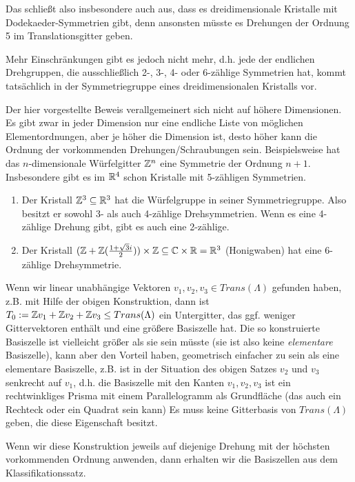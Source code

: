 \begin{remark}
Das schließt also insbesondere auch aus, dass es dreidimensionale Kristalle mit Dodekaeder-Symmetrien gibt, denn ansonsten müsste es Drehungen der Ordnung 5 im Translationsgitter geben.

Mehr Einschränkungen gibt es jedoch nicht mehr, d.h. jede der endlichen Drehgruppen, die ausschließlich 2-, 3-, 4- oder 6-zählige Symmetrien hat, kommt tatsächlich in der Symmetriegruppe eines dreidimensionalen Kristalls vor.

Der hier vorgestellte Beweis verallgemeinert sich nicht auf höhere Dimensionen. Es gibt zwar in jeder Dimension nur eine endliche Liste von möglichen Elementordnungen, aber je höher die Dimension ist, desto höher kann die Ordnung der vorkommenden Drehungen/Schraubungen sein. Beispielsweise hat das $n$-dimensionale Würfelgitter $\mathbb{Z}^n$ eine Symmetrie der Ordnung $n+1$. Insbesondere gibt es im $\mathbb{R}^4$ schon Kristalle mit 5-zähligen Symmetrien.
\end{remark}

\begin{example}
\begin{enumerate}
\item Der Kristall $\mathbb{Z}^3\subseteq\mathbb{R}^3$ hat die Würfelgruppe in seiner Symmetriegruppe. Also besitzt er sowohl 3- als auch 4-zählige Drehsymmetrien. Wenn es eine 4-zählige Drehung gibt, gibt es auch eine 2-zählige.
\item Der Kristall $(\mathbb{Z}+\mathbb{Z}(\tfrac{1+\sqrt{3}i}{2})) \times \mathbb{Z} \subseteq \mathbb{C}\times\mathbb{R} = \mathbb{R}^3$ (Honigwaben) hat eine 6-zählige Drehsymmetrie.
\end{enumerate}
\end{example}

\begin{remark}
Wenn wir linear unabhängige Vektoren $v_1,v_2,v_3\in Trans(\Lambda)$ gefunden haben, z.B. mit Hilfe der obigen Konstruktion, dann ist $T_0:=\mathbb{Z} v_1+\mathbb{Z} v_2+\mathbb{Z} v_3 \leq Trans(\Lambda)$ ein Untergitter, das ggf. weniger Gittervektoren enthält und eine größere Basiszelle hat. Die so konstruierte Basiszelle ist vielleicht größer als sie sein müsste (sie ist also keine \emph{elementare} Basiszelle), kann aber den Vorteil haben, geometrisch einfacher zu sein als eine elementare Basiszelle, z.B. ist in der Situation des obigen Satzes $v_2$ und $v_3$ senkrecht auf $v_1$, d.h. die Basiszelle mit den Kanten $v_1,v_2,v_3$ ist ein rechtwinkliges Prisma mit einem Parallelogramm als Grundfläche (das auch ein Rechteck oder ein Quadrat sein kann) Es muss keine Gitterbasis von $Trans(\Lambda)$ geben, die diese Eigenschaft besitzt.

Wenn wir diese Konstruktion jeweils auf diejenige Drehung mit der höchsten vorkommenden Ordnung anwenden, dann erhalten wir die Basiszellen aus dem Klassifikationssatz.
\end{remark}

